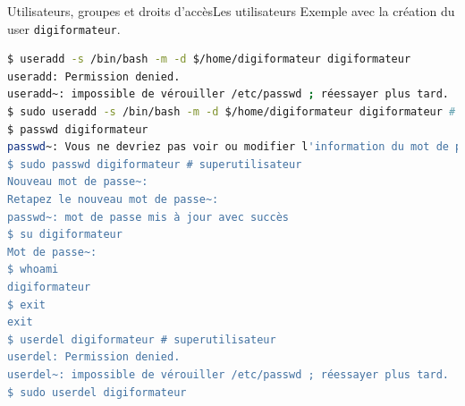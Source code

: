 \documentclass{beamer}
\begin{document}
    \begin{frame}[fragile]{Utilisateurs, groupes et droits d'accès}{Les utilisateurs}
        Exemple avec la création du user \lstinline{digiformateur}.
        \begin{lstlisting}[language=bash]
$ useradd -s /bin/bash -m -d $/home/digiformateur digiformateur
useradd: Permission denied.
useradd~: impossible de vérouiller /etc/passwd ; réessayer plus tard.
$ sudo useradd -s /bin/bash -m -d $/home/digiformateur digiformateur # sudo
$ passwd digiformateur
passwd~: Vous ne devriez pas voir ou modifier l'information du mot de passe pour digiformateur.
$ sudo passwd digiformateur # superutilisateur
Nouveau mot de passe~:
Retapez le nouveau mot de passe~:
passwd~: mot de passe mis à jour avec succès
$ su digiformateur
Mot de passe~:
$ whoami
digiformateur
$ exit
exit
$ userdel digiformateur # superutilisateur
userdel: Permission denied.
userdel~: impossible de vérouiller /etc/passwd ; réessayer plus tard.
$ sudo userdel digiformateur
        \end{lstlisting}
    \end{frame}
\end{document}
